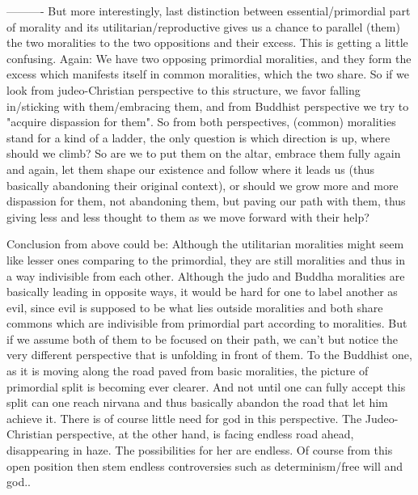 \documentclass[10pt]{book}
\begin{document}
----------
But more interestingly, last distinction between essential/primordial part of morality and its utilitarian/reproductive gives us a chance to parallel (them) the two moralities to the two oppositions and their excess. This is getting a little confusing. Again: We have two opposing primordial moralities, and they form the excess which manifests itself in common moralities, which the two share. So if we look from judeo-Christian perspective to this structure, we favor falling in/sticking with them/embracing them, and from Buddhist perspective we try to "acquire dispassion for them". So from both perspectives, (common) moralities stand for a kind of a ladder, the only question is which direction is up, where should we climb? So are we to put them on the altar, embrace them fully again and again, let them shape our existence and follow where it leads us (thus basically abandoning their original context), or should we grow more and more dispassion for them, not abandoning them, but paving our path with them, thus giving less and less thought to them as we move forward with their help?   

Conclusion from above could be: Although the utilitarian moralities might seem like lesser ones comparing to the primordial, they are still moralities and thus in a way indivisible from each other. Although the judo and Buddha moralities are basically leading in opposite ways, it would be hard for one to label another as evil, since evil is supposed to be what lies outside moralities and both share commons which are indivisible from primordial part according to moralities. 
But if we assume both of them to be focused on their path, we can't but notice the very different perspective that is unfolding in front of them. To the Buddhist one, as it is moving along the road paved from basic moralities, the picture of primordial split is becoming ever clearer. And not until one can fully accept this split can one reach nirvana and thus basically abandon the road that let him achieve it. There is of course little need for god in this perspective.
The Judeo-Christian perspective, at the other hand, is facing endless road ahead, disappearing in haze. The possibilities for her are endless. Of course from this open position then stem endless controversies such as determinism/free will and god..  
\end{document}
